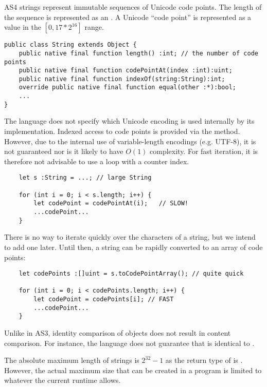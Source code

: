 AS4 strings represent immutable sequences of Unicode code points. The length of
the sequence is represented as an .
A Unicode ``code point'' is represented as a  value in the $[0, 17 * 2^{16}]$
range.
\begin{verbatim}
public class String extends Object {
    public native final function length() :int; // the number of code points
    public native final function codePointAt(index :int):uint;
    public native final function indexOf(string:String):int;
    override public native final function equal(other :*):bool;
    ...
}
\end{verbatim}

The language does not specify which Unicode encoding is used
internally by its implementation. Indexed access to code points is
provided via the  method. However, due to the
internal use of variable-length encodings (e.g. UTF-8), it is not guaranteed nor
is it likely to have $O(1)$ complexity.
For fast iteration, it is therefore not advisable to use a loop with a counter index.

\begin{minipage}{\linewidth}
\begin{verbatim}
    let s :String = ...; // large String

    for (int i = 0; i < s.length; i++) {
        let codePoint = codePointAt(i);   // SLOW!
        ...codePoint...
    }
\end{verbatim}
\end{minipage}

There is no way to iterate quickly over the characters of a string,
but we intend to add one later.
Until then, a string can be rapidly converted to an array of code points:
\begin{verbatim}
    let codePoints :[]uint = s.toCodePointArray(); // quite quick

    for (int i = 0; i < codePoints.length; i++) {
        let codePoint = codePoints[i]; // FAST
        ...codePoint...
    }
\end{verbatim}

Unlike in AS3, identity comparison of  objects does not
result in content comparison. For instance, the language does not
guarantee that 
is identical to .

The absolute maximum length of strings is $2^{32}-1$ as the return type of
 is . However, the actual maximum size that can
be created in a program is limited to whatever the current runtime allows.

